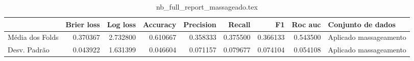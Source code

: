 \begin{table}
\centering
\caption{nb_full_report_massageado.tex}
\label{nb_full_report_massageado.tex}
\begin{tabular}{lrrrrrrrl}
\toprule
{} &  Brier  loss &  Log loss &  Accuracy  &  Precision  &   Recall  &       F1  &  Roc auc  &       Conjunto de dados \\
\midrule
Média dos Folds &     0.370367 &  2.732800 &   0.610667 &    0.358333 &  0.375500 &  0.366133 &  0.543500 &  Aplicado massageamento \\
Desv. Padrão    &     0.043922 &  1.631399 &   0.046604 &    0.071157 &  0.079677 &  0.074104 &  0.054108 &  Aplicado massageamento \\
\bottomrule
\end{tabular}
\end{table}
